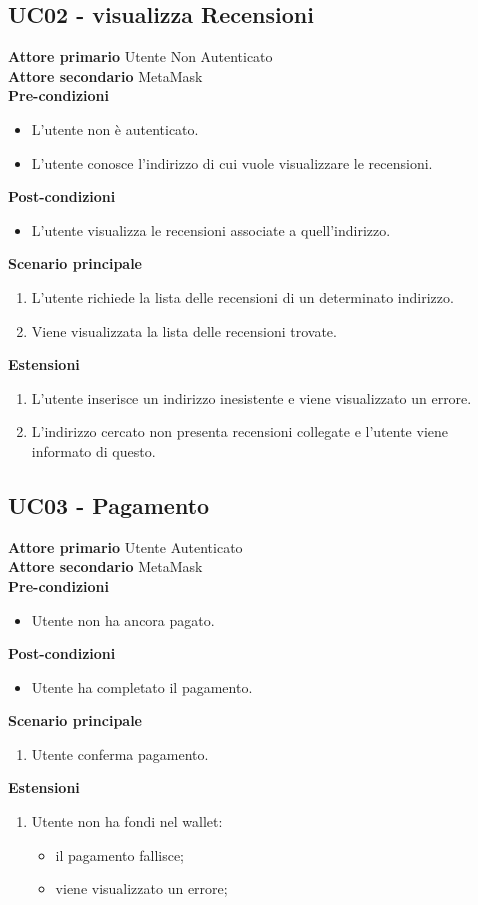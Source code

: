\subsection{UC02 - visualizza Recensioni}
\textbf{Attore primario} Utente Non Autenticato \\
\textbf{Attore secondario} MetaMask \\
\textbf{Pre-condizioni}
\begin{itemize}
    \item L'utente non è autenticato.
    \item L'utente conosce l'indirizzo di cui vuole visualizzare le recensioni.
\end{itemize}
\textbf{Post-condizioni}
\begin{itemize}
    \item L'utente visualizza le recensioni associate a quell'indirizzo.
\end{itemize}
\textbf{Scenario principale}
\begin{enumerate}
    \item L'utente richiede la lista delle recensioni di un determinato indirizzo.
    \item Viene visualizzata la lista delle recensioni trovate.
\end{enumerate}
\textbf{Estensioni}
\begin{enumerate}
    \item L'utente inserisce un indirizzo inesistente e viene visualizzato un errore.
    \item L'indirizzo cercato non presenta recensioni collegate e l'utente viene informato di questo.
\end{enumerate}

\subsection{UC03 - Pagamento}
\textbf{Attore primario} Utente Autenticato \\
\textbf{Attore secondario} MetaMask \\
\textbf{Pre-condizioni}
\begin{itemize}
    \item Utente non ha ancora pagato.
\end{itemize}
\textbf{Post-condizioni}
\begin{itemize}
    \item Utente ha completato il pagamento.
\end{itemize}
\textbf{Scenario principale}
\begin{enumerate}
    \item Utente conferma pagamento.
\end{enumerate}
\textbf{Estensioni}
\begin{enumerate}
    \item Utente non ha fondi nel wallet:
    \begin{itemize}
        \item il pagamento fallisce;
        \item viene visualizzato un errore;
    \end{itemize}
\end{enumerate}

